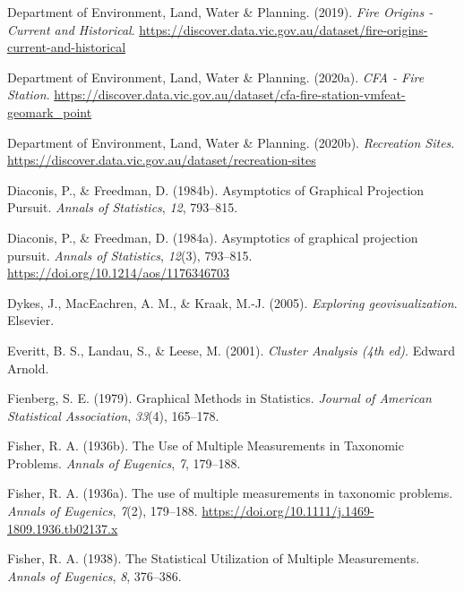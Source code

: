 \documentclass[
  letterpaper,
]{krantz}
\newlength{\cslhangindent}
\newlength{\cslentryspacingunit} %
\newenvironment{CSLReferences}[2] %
 {%
  \setlength{\parindent}{0pt}
  \ifodd #1
  \let\oldpar\par
  \def\par{\hangindent=\cslhangindent\oldpar}
  \fi
  \setlength{\parskip}{#2\cslentryspacingunit}
 }%
 {}
\begin{document}
\begin{CSLReferences}{1}{0}
\leavevmode{}%
Department of Environment, Land, Water \& Planning. (2019). \emph{{Fire
Origins - Current and Historical}}.
\url{https://discover.data.vic.gov.au/dataset/fire-origins-current-and-historical}

\leavevmode{}%
Department of Environment, Land, Water \& Planning. (2020a). \emph{{CFA
- Fire Station}}.
\url{https://discover.data.vic.gov.au/dataset/cfa-fire-station-vmfeat-geomark_point}

\leavevmode{}%
Department of Environment, Land, Water \& Planning. (2020b).
\emph{{Recreation Sites}}.
\url{https://discover.data.vic.gov.au/dataset/recreation-sites}

\leavevmode{}%
Diaconis, P., \& Freedman, D. (1984b). {A}symptotics of {G}raphical
{P}rojection {P}ursuit. \emph{Annals of Statistics}, \emph{12},
793--815.

\leavevmode{}%
Diaconis, P., \& Freedman, D. (1984a). Asymptotics of graphical
projection pursuit. \emph{Annals of Statistics}, \emph{12}(3), 793--815.
\url{https://doi.org/10.1214/aos/1176346703}

\leavevmode{}%
Dykes, J., MacEachren, A. M., \& Kraak, M.-J. (2005). \emph{Exploring
geovisualization}. Elsevier.

\leavevmode{}%
Everitt, B. S., Landau, S., \& Leese, M. (2001). \emph{Cluster
{A}nalysis (4th ed)}. Edward Arnold.

\leavevmode{}%
Fienberg, S. E. (1979). Graphical {M}ethods in {S}tatistics.
\emph{Journal of American Statistical Association}, \emph{33}(4),
165--178.

\leavevmode{}%
Fisher, R. A. (1936b). The {U}se of {M}ultiple {M}easurements in
{T}axonomic {P}roblems. \emph{Annals of Eugenics}, \emph{7}, 179--188.

\leavevmode{}%
Fisher, R. A. (1936a). The use of multiple measurements in taxonomic
problems. \emph{Annals of Eugenics}, \emph{7}(2), 179--188.
\url{https://doi.org/10.1111/j.1469-1809.1936.tb02137.x}

\leavevmode{}%
Fisher, R. A. (1938). The {S}tatistical {U}tilization of {M}ultiple
{M}easurements. \emph{Annals of Eugenics}, \emph{8}, 376--386.


\end{CSLReferences}
\end{document}
